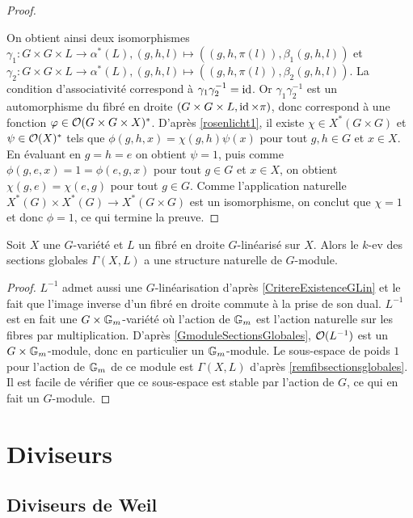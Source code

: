 \begin{proof}
\begin{center}
\begin{tikzcd}
	\end{tikzcd}
	\end{center}
	On obtient ainsi deux isomorphismes $\gamma_1:G\times G\times L\rightarrow\alpha^*(L), (g,h,l)\mapsto ((g,h,\pi(l)), \beta_1(g,h,l))$ et $\gamma_2:G\times G\times L\rightarrow\alpha^*(L), (g,h,l)\mapsto ((g,h,\pi(l)), \beta_2(g,h,l))$. La condition d'associativité correspond à $\gamma_1\gamma_2^{-1}=\id$. Or $\gamma_1\gamma_2^{-1}$ est un automorphisme du fibré en droite $(G\times G\times L,\id\times \pi)$, donc correspond à une fonction $\phi\in \Oo(G\times G\times X)^*$. D'après \ref{rosenlicht1}, il existe $\chi\in X^*(G\times G)$ et $\psi\in\Oo(X)^*$ tels que $\phi(g,h,x)=\chi(g,h)\psi(x)$ pour tout $g,h\in G$ et $x\in X$. En évaluant en $g=h=e$ on obtient $\psi=1$, puis comme $\phi(g,e,x)=1=\phi(e,g,x)$ pour tout $g\in G$ et $x\in X$, on obtient $\chi(g,e)=\chi(e,g)$ pour tout $g\in G$. Comme l'application naturelle $X^*(G)\times X^*(G)\rightarrow X^*(G\times G)$ est un isomorphisme, on conclut que $\chi=1$ et donc $\phi=1$, ce qui termine la preuve.
\end{proof}

\begin{prop}\label{GmoduleSectionsGlobalesGlin}
Soit $X$ une $G$-variété et $L$ un fibré en droite $G$-linéarisé sur $X$. Alors le $k$-ev des sections globales $\Gamma(X, L)$ a une structure naturelle de $G$-module.
\end{prop}
\begin{proof}
$L^{-1}$ admet aussi une $G$-linéarisation d'après \ref{CritereExistenceGLin} et le fait que l'image inverse d'un fibré en droite commute à la prise de son dual. $L^{-1}$ est en fait une $G\times \GG_m$-variété où l'action de $\GG_m$ est l'action naturelle sur les fibres par multiplication. D'après \ref{GmoduleSectionsGlobales}, $\Oo(L^{-1})$ est un $G\times \GG_m$-module, donc en particulier un $\GG_m$-module. Le sous-espace de poids $1$ pour l'action de $\GG_m$ de ce module est $\Gamma(X, L)$ d'après \ref{remfibsectionsglobales}. Il est facile de vérifier que ce sous-espace est stable par l'action de $G$, ce qui en fait un $G$-module.
\end{proof}

\section{Diviseurs}

\subsection{Diviseurs de Weil}

